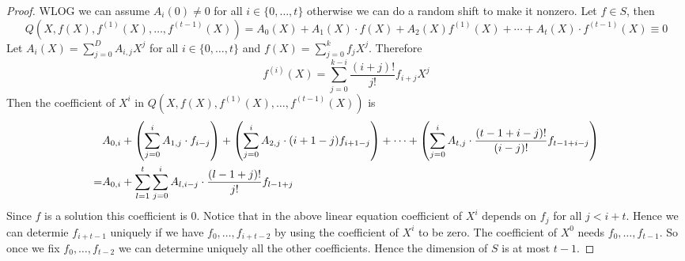 \begin{proof}
WLOG we can assume $A_i(0)\neq 0$ for all $i\in\{0,\dots, t\}$ otherwise we can do a random shift to make it nonzero. Let $f\in S$, then $$Q(X,f(X),f^{(1)}(X),\dots, f^{(t-1)}(X))=A_0(X)+A_1(X)\cdot f(X)+A_2(X)f^{(1)}(X)+\cdots +A_t(X)\cdot f^{(t-1)}(X)\equiv 0$$Let $A_i(X)=\sum\limits_{j=0}^D A_{i,j}X^j$ for all $i\in\{0,\dots, t\}$ and $f(X)=\sum\limits_{j=0}^k f_j X^j$. Therefore $$f^{(i)}(X)=\sum\limits_{j=0}^{k-i}\frac{(i+j)!}{j!}f_{i+j}X^j$$ Then the coefficient of $X^i$ in $Q(X,f(X),f^{(1)}(X),\dots, f^{(t-1)}(X))$ is \begin{align*}
    &A_{0,i}+\left(\sum\limits_{j=0}^iA_{1,j}\cdot f_{i-j}\right)+\left( \sum\limits_{j=0}^i A_{2,j}\cdot  (i+1-j)f_{i+1-j} \right)+\cdots + \left( \sum\limits_{j=0}^i A_{t,j}\cdot \frac{(t-1+i-j)!}{(i-j)!}f_{t-1+i-j} \right)\\ 
    =& A_{0,i}+\sum\limits_{l=1}^{t}\sum\limits_{j=0}^i A_{l,i-j}\cdot \frac{(l-1+j)!}{j!}f_{l-1+j}
\end{align*}Since $f$ is a solution this coefficient is $0$. Notice that in the above linear equation coefficient of $X^i$ depends on $f_j$ for all $j<i+t$. Hence we can determie $f_{i+t-1}$ uniquely if we have $f_0,\dots, f_{i+t-2}$ by using the coefficient of $X^i$ to be zero. The coefficient of $X^0$ needs $f_0,\dots, f_{t-1}$. So once we fix $f_0,\dots, f_{t-2}$ we can determine uniquely all the other coefficients. Hence the dimension of $S$ is at most $t-1$.
\end{proof}


